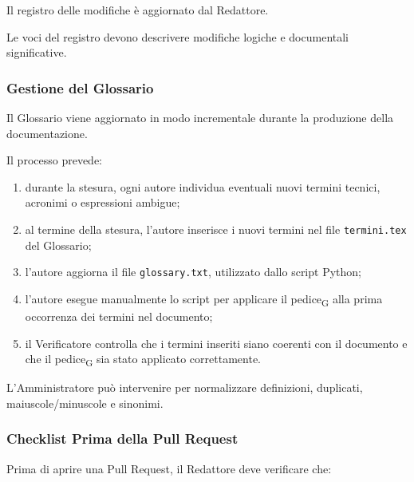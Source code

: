 Il registro delle modifiche è aggiornato dal Redattore.

Le voci del registro devono descrivere modifiche logiche e documentali significative.


\subsubsection{Gestione del Glossario}

Il Glossario viene aggiornato in modo incrementale durante la produzione della
documentazione.

Il processo prevede:

\begin{enumerate}
    \item durante la stesura, ogni autore individua eventuali nuovi termini tecnici,
    acronimi o espressioni ambigue;

    \item al termine della stesura, l'autore inserisce i nuovi termini nel file
    \texttt{termini.tex} del Glossario;

    \item l'autore aggiorna il file \texttt{glossary.txt}, utilizzato dallo script
    Python;

    \item l'autore esegue manualmente lo script per applicare il pedice\textsubscript{G}
     alla prima occorrenza dei termini nel documento;

    \item il Verificatore controlla che i termini inseriti siano coerenti con il
    documento e che il pedice\textsubscript{G} sia stato applicato correttamente.
\end{enumerate}

L'Amministratore può intervenire per normalizzare definizioni, duplicati,
maiuscole/minuscole e sinonimi.


\subsubsection{Checklist Prima della Pull Request}

Prima di aprire una Pull Request, il Redattore deve verificare che:

